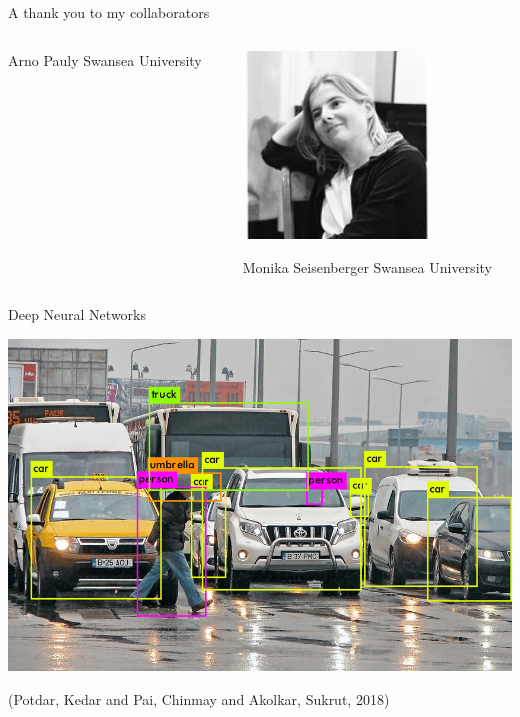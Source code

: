 \documentclass[smaller]{beamer}
\begin{document}
\begin{frame}[label={sec:org99dcfe8}]{A thank you to my collaborators}
\begin{columns}
\begin{column}{0.3\columnwidth}
\begin{center}
Arno Pauly
Swansea University
\end{center}
\end{column}

\begin{column}{0.3\columnwidth}
\begin{center}
\includegraphics[width=0.7\textwidth]{images/Monika-Seisenberger.jpg}
\end{center}

\begin{center}
Monika Seisenberger
Swansea University
\end{center}
\end{column}
\end{columns}
\end{frame}

\begin{frame}[label={sec:org3bbab8c}]{Deep Neural Networks}
\begin{center}
\includegraphics[width=.9\linewidth]{images/Object-detection-in-a-dense-scene.jpg}
\end{center}
(Potdar, Kedar and Pai, Chinmay and Akolkar, Sukrut, 2018)
\end{frame}
\end{document}
